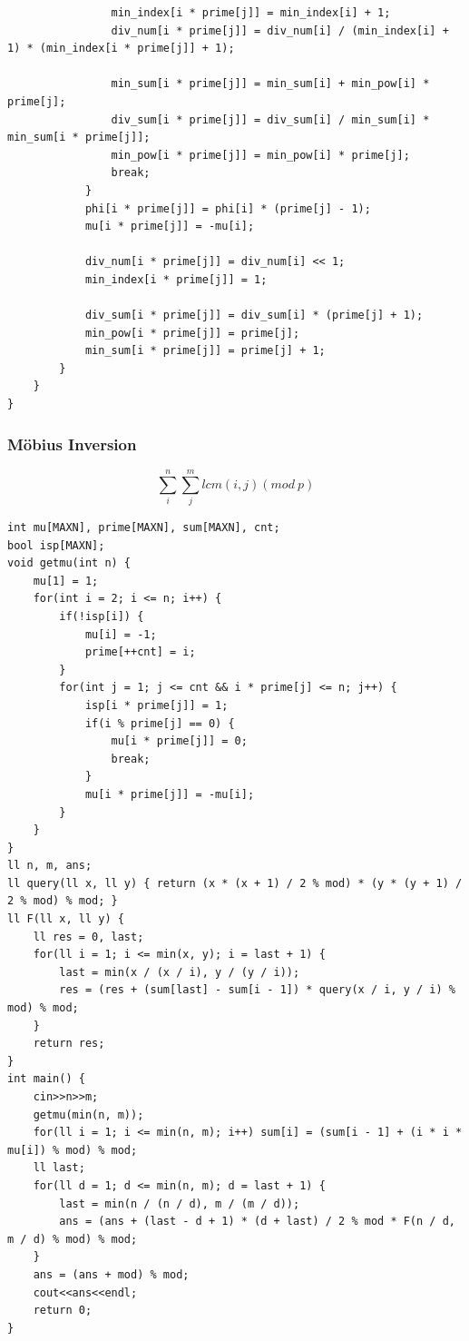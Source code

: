 \documentclass[10pt]{ctexart}
\begin{document}
{\begin{lstlisting}
                min_index[i * prime[j]] = min_index[i] + 1;
                div_num[i * prime[j]] = div_num[i] / (min_index[i] + 1) * (min_index[i * prime[j]] + 1);

                min_sum[i * prime[j]] = min_sum[i] + min_pow[i] * prime[j];
                div_sum[i * prime[j]] = div_sum[i] / min_sum[i] * min_sum[i * prime[j]];
                min_pow[i * prime[j]] = min_pow[i] * prime[j];
                break;
            }
            phi[i * prime[j]] = phi[i] * (prime[j] - 1);
            mu[i * prime[j]] = -mu[i];

            div_num[i * prime[j]] = div_num[i] << 1;
            min_index[i * prime[j]] = 1;

            div_sum[i * prime[j]] = div_sum[i] * (prime[j] + 1);
            min_pow[i * prime[j]] = prime[j];
            min_sum[i * prime[j]] = prime[j] + 1;
        }
    }
}
\end{lstlisting}
\subsubsection{Möbius Inversion}
$$
\sum_i^n \sum_j^m lcm(i,j) (mod\ p)
$$
\begin{lstlisting}
int mu[MAXN], prime[MAXN], sum[MAXN], cnt;
bool isp[MAXN];
void getmu(int n) {
    mu[1] = 1;
    for(int i = 2; i <= n; i++) {
        if(!isp[i]) {
            mu[i] = -1;
            prime[++cnt] = i;
        }
        for(int j = 1; j <= cnt && i * prime[j] <= n; j++) {
            isp[i * prime[j]] = 1;
            if(i % prime[j] == 0) {
                mu[i * prime[j]] = 0;
                break;
            }
            mu[i * prime[j]] = -mu[i];
        }
    }
}
ll n, m, ans;
ll query(ll x, ll y) { return (x * (x + 1) / 2 % mod) * (y * (y + 1) / 2 % mod) % mod; }
ll F(ll x, ll y) {
    ll res = 0, last;
    for(ll i = 1; i <= min(x, y); i = last + 1) {
        last = min(x / (x / i), y / (y / i));
        res = (res + (sum[last] - sum[i - 1]) * query(x / i, y / i) % mod) % mod;
    }
    return res;
}
int main() {
    cin>>n>>m;
    getmu(min(n, m));
    for(ll i = 1; i <= min(n, m); i++) sum[i] = (sum[i - 1] + (i * i * mu[i]) % mod) % mod;
    ll last;
    for(ll d = 1; d <= min(n, m); d = last + 1) {
        last = min(n / (n / d), m / (m / d));
        ans = (ans + (last - d + 1) * (d + last) / 2 % mod * F(n / d, m / d) % mod) % mod;
    }
    ans = (ans + mod) % mod;
    cout<<ans<<endl;
    return 0;
}
\end{lstlisting}





}
\end{document}
